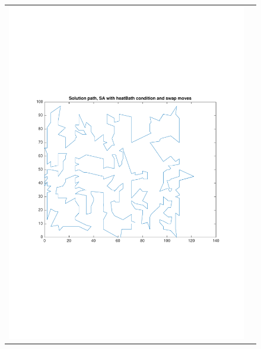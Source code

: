 \documentclass[a4paper, 11pt]{scrartcl}
\begin{document}
\begin{figure}[!ht]
  \centering
  \begin{tabular}{cc}
    \includegraphics[scale=0.4, trim={3cm 6cm 1cm 6cm}]{../figures/solutionPath_SA_heatBath_swap.pdf} & 

\end{tabular}
\end{figure}
\end{document}
